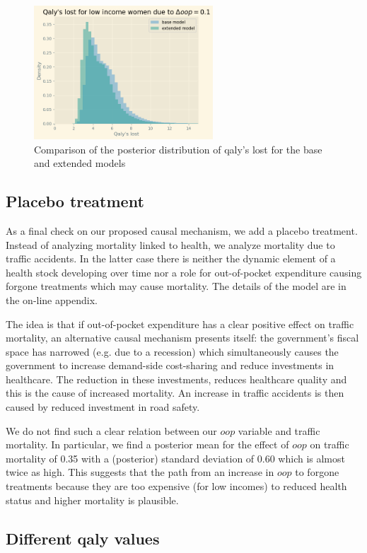 \documentclass[a4paper,12pt]{article}
\begin{document}
\begin{figure}[htbp]
\centering
\includegraphics[height=5cm]{./figures/lifeyears_comparison_extended.png}
\caption{\label{fig:comparisonBaseExtendedModel}Comparison of the posterior distribution of qaly's lost for the base and extended models}
\end{figure}
\subsection{Placebo treatment}
\label{sec:orga3834f2}

As a final check on our proposed causal mechanism, we add a placebo treatment. Instead of analyzing mortality linked to health, we analyze mortality due to traffic accidents. In the latter case there is neither the dynamic element of a health stock developing over time nor a role for out-of-pocket expenditure causing forgone treatments which may cause mortality. The details of the model are in the on-line appendix.

The idea is that if out-of-pocket expenditure has a clear positive effect on traffic mortality, an alternative causal mechanism presents itself: the government's fiscal space has narrowed (e.g. due to a recession) which simultaneously causes the government to increase demand-side cost-sharing and reduce investments in healthcare. The reduction in these investments, reduces healthcare quality and this is the cause of increased mortality. An increase in traffic accidents is then caused by reduced investment in road safety.

We do not find such a clear relation between our \(oop\) variable and traffic mortality. In particular, we find a posterior mean for the effect of \(oop\) on traffic mortality of 0.35 with a (posterior) standard deviation of 0.60 which is almost twice as high. This suggests that the path from an increase in \(oop\) to forgone treatments because they are too expensive (for low incomes) to reduced health status and higher mortality is plausible.
\subsection{Different qaly values}
\label{sec:orgbb86521}
\end{document}
